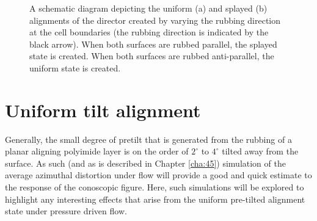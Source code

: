 \begin{figure}
\begin{center}
\hspace{0.5in}
\end{center}
\caption[Schematic diagram of the splayed and uniform states]{\label{fig:uniform_splayed} A schematic diagram depicting the uniform (a) and splayed (b) alignments of the director created by varying the rubbing direction at the cell boundaries (the rubbing direction is indicated by the black arrow). When both surfaces are rubbed parallel, the splayed state is created. When both surfaces are rubbed anti-parallel, the uniform state is created.}
\end{figure}

\section{Uniform tilt alignment}
Generally, the small degree of pretilt that is generated from the rubbing of a planar aligning polyimide layer is on the order of $2^{\circ}$ to $4^{\circ}$ tilted away from the surface. As such (and as is described in Chapter \ref{cha:45}) simulation of the average azimuthal distortion under flow will provide a good and quick estimate to the response of the conoscopic figure. Here, such simulations will be explored to highlight any interesting effects that arise from the uniform pre-tilted alignment state under pressure driven flow.

